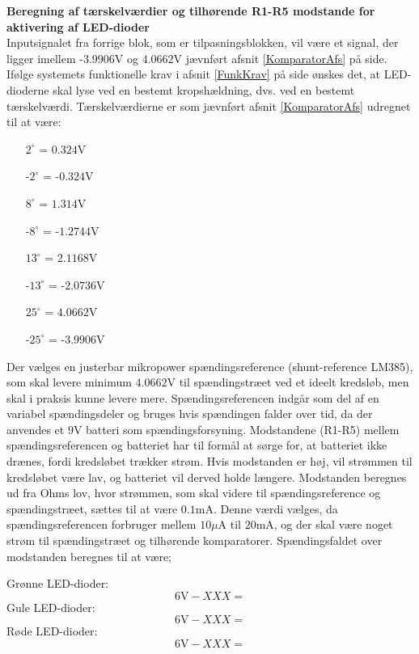 \noindent\textbf{Beregning af tærskelværdier og tilhørende R1-R5 modstande for aktivering af LED-dioder} \\
Inputsignalet fra forrige blok, som er tilpasningsblokken, vil være et signal, der ligger imellem -$3.9906$V og $4.0662$V jævnført afsnit \ref{KomparatorAfs} på side\pageref{KomparatorAfs}. Ifølge systemets funktionelle krav i afsnit \ref{FunkKrav} på side \pageref{FunkKrav} ønskes det, at LED-dioderne skal lyse ved en bestemt kropshældning, dvs. ved en bestemt tærskelværdi. %
Tærskelværdierne er som jævnført afsnit \ref{KomparatorAfs} udregnet til at være:
\begin{itemize}
\item[$2^{\circ}$ = $0.324$V]
\item[-$2^{\circ}$ = -$0.324$V]
\item[$8^{\circ}$ = $1.314$V]
\item[-$8^{\circ}$ = -$1.2744$V]
\item[$13^{\circ}$ = $2.1168$V]
\item[-$13^{\circ}$ = -$2.0736$V]
\item[$25^{\circ}$ = $4.0662$V]
\item[-$25^{\circ}$ = -$3.9906$V]
\end{itemize}

Der vælges en justerbar mikropower spændingsreference (shunt-reference LM385), som skal levere minimum $4.0662$V til spændingstræet ved et ideelt kredsløb, men skal i praksis kunne levere mere. Spændingsreferencen indgår som del af en variabel spændingsdeler og bruges hvis spændingen falder over tid, da der anvendes et $9$V batteri som spændingsforsyning. Modstandene (R1-R5) mellem spændingsreferencen og batteriet har til formål at sørge for, at batteriet ikke drænes, fordi kredsløbet trækker strøm. Hvis modstanden er høj, vil strømmen til kredsløbet være lav, og batteriet vil derved holde længere. Modstanden beregnes ud fra Ohms lov, hvor strømmen, som skal videre til spændingsreference og spændingstræet, sættes til at være $0.1$mA. Denne værdi vælges, da spændingsreferencen forbruger mellem $10\mu$A til $20$mA, og der skal være noget strøm til spændingstræet og tilhørende komparatorer. Spændingsfaldet over modstanden beregnes til at være;

Grønne LED-dioder:
\begin{equation}
6\text{V} - XXX  =   
\end{equation}
Gule LED-dioder:
\begin{equation}
6\text{V} - XXX  =   
\end{equation}
Røde LED-dioder: 
\begin{equation}
6\text{V} - XXX  =   
\end{equation}


